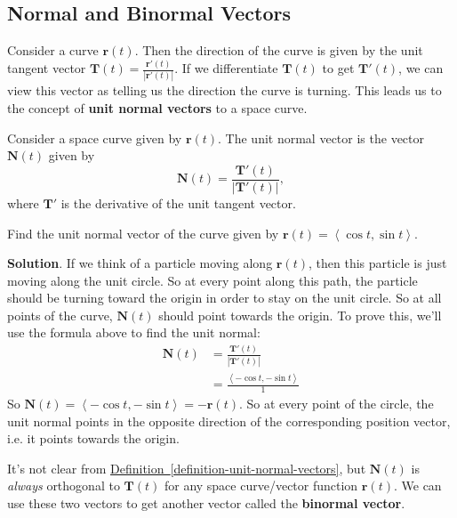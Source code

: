 \documentclass[10pt,]{book}
\newcommand{\terminology}[1]{\textbf{#1}}
\theoremstyle{ptxplainnotitle}
\theoremstyle{ptxplaintitle}
\theoremstyle{ptxplainnotitle}
\theoremstyle{ptxplaintitle}
\theoremstyle{ptxplainnotitle}
\theoremstyle{ptxplaintitle}
\theoremstyle{ptxdefinitionnotitle}
\theoremstyle{ptxdefinitiontitle}
\theoremstyle{ptxdefinitionnotitle}
\theoremstyle{ptxdefinitiontitle}
\theoremstyle{ptxdefinitionnotitle}
\theoremstyle{ptxdefinitiontitle}
\theoremstyle{ptxdefinitionnotitle}
\theoremstyle{ptxdefinitiontitle}
\theoremstyle{ptxdefinitionnotitle}
\theoremstyle{ptxdefinitiontitle}
\numberwithin{equation}{section}
\newcommand{\vv}[1]{\mathbf{#1}}
\newcommand{\dotprod}[1]{\left\langle #1 \right\rangle}
\begin{document}
\subsection[{Normal and Binormal Vectors}]{Normal and Binormal Vectors}\label{subsection-normal-and-binormal-vectors}
\hypertarget{p-955}{}%
Consider a curve \(\vv{r}(t)\). Then the direction of the curve is given by the unit tangent vector \(\vv{T}(t) = \frac{\vv{r}'(t)}{|\vv{r}'(t)|}\). If we differentiate \(\vv{T}(t)\) to get \(\vv{T}'(t)\), we can view this vector as telling us the direction the curve is turning. This leads us to the concept of \terminology{unit normal vectors} to a space curve.%
\begin{definition}\label{definition-unit-normal-vectors}
\hypertarget{p-956}{}%
Consider a space curve given by \(\vv{r}(t)\). The unit normal vector is the vector \(\vv{N}(t)\) given by%
%
\begin{equation*}
\vv{N}(t) = \frac{\vv{T}'(t)}{|\vv{T}'(t)|},
\end{equation*}
\hypertarget{p-957}{}%
where \(\vv{T}'\) is the derivative of the unit tangent vector.%
\end{definition}
\begin{example}\label{example-unit-normal-on-a-circle}
\hypertarget{p-958}{}%
Find the unit normal vector of the curve given by \(\vv{r}(t) = \dotprod{\cos t,\sin t}\).%
\par\smallskip%
\noindent\textbf{Solution}.\hypertarget{solution-146}{}\quad%
\hypertarget{p-959}{}%
If we think of a particle moving along \(\vv{r}(t)\), then this particle is just moving along the unit circle. So at every point along this path, the particle should be turning toward the origin in order to stay on the unit circle. So at all points of the curve, \(\vv{N}(t)\) should point towards the origin. To prove this, we'll use the formula above to find the unit normal:%
%
\begin{align*}
\vv{N}(t) & = \frac{\vv{T}'(t)}{|\vv{T}'(t)|} \\
& = \frac{\dotprod{-\cos t, -\sin t}}{1} 
\end{align*}
\hypertarget{p-960}{}%
So \(\vv{N}(t) = \dotprod{-\cos t, -\sin t} = -\vv{r}(t)\). So at every point of the circle, the unit normal points in the opposite direction of the corresponding position vector, i.e. it points towards the origin.%
\end{example}
\hypertarget{p-961}{}%
It's not clear from \hyperref[definition-unit-normal-vectors]{Definition~\ref{definition-unit-normal-vectors}}, but \(\vv{N}(t)\) is \emph{always} orthogonal to \(\vv{T}(t)\) for any space curve/vector function \(\vv{r}(t)\). We can use these two vectors to get another vector called the \terminology{binormal vector}.%
\end{document}
